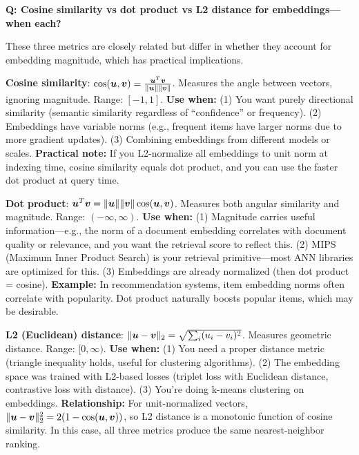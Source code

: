 \begin{interviewq}
\textbf{Q: Cosine similarity vs dot product vs L2 distance for embeddings---when each?}

 \quad {} \quad \badgefreq{\freqhigh}

\stronganswer

These three metrics are closely related but differ in whether they account for embedding magnitude, which has practical implications.

\textbf{Cosine similarity}: $\cos(\bm{u}, \bm{v}) = \frac{\bm{u}^T\bm{v}}{\|\bm{u}\|\|\bm{v}\|}$. Measures the angle between vectors, ignoring magnitude. Range: $[-1, 1]$. \textbf{Use when:} (1) You want purely directional similarity (semantic similarity regardless of ``confidence'' or frequency). (2) Embeddings have variable norms (e.g., frequent items have larger norms due to more gradient updates). (3) Combining embeddings from different models or scales. \textbf{Practical note:} If you L2-normalize all embeddings to unit norm at indexing time, cosine similarity equals dot product, and you can use the faster dot product at query time.

\textbf{Dot product}: $\bm{u}^T\bm{v} = \|\bm{u}\|\|\bm{v}\|\cos(\bm{u},\bm{v})$. Measures both angular similarity and magnitude. Range: $(-\infty, \infty)$. \textbf{Use when:} (1) Magnitude carries useful information---e.g., the norm of a document embedding correlates with document quality or relevance, and you want the retrieval score to reflect this. (2) MIPS (Maximum Inner Product Search) is your retrieval primitive---most ANN libraries are optimized for this. (3) Embeddings are already normalized (then dot product = cosine). \textbf{Example:} In recommendation systems, item embedding norms often correlate with popularity. Dot product naturally boosts popular items, which may be desirable.

\textbf{L2 (Euclidean) distance}: $\|\bm{u} - \bm{v}\|_2 = \sqrt{\sum_i(u_i-v_i)^2}$. Measures geometric distance. Range: $[0, \infty)$. \textbf{Use when:} (1) You need a proper distance metric (triangle inequality holds, useful for clustering algorithms). (2) The embedding space was trained with L2-based losses (triplet loss with Euclidean distance, contrastive loss with distance). (3) You're doing k-means clustering on embeddings. \textbf{Relationship:} For unit-normalized vectors, $\|\bm{u} - \bm{v}\|_2^2 = 2(1 - \cos(\bm{u},\bm{v}))$, so L2 distance is a monotonic function of cosine similarity. In this case, all three metrics produce the same nearest-neighbor ranking.


\end{interviewq}
